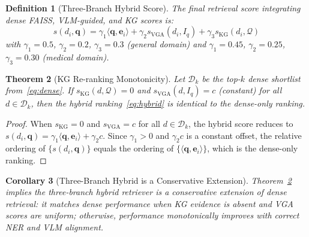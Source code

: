 \documentclass[10pt,conference]{IEEEtran}
\theoremstyle{ieeethm}
\newtheorem{theorem}{Theorem}
\newtheorem{corollary}[theorem]{Corollary}
\theoremstyle{ieeedef}
\newtheorem{definition}[theorem]{Definition}
\theoremstyle{ieeeremark}
\begin{document}
\begin{definition}[Three-Branch Hybrid Score]
\label{def:hybrid}
The final retrieval score integrating dense FAISS, VLM-guided, and KG scores is:
\begin{equation}
s(d_i, \mathbf{q}) = \gamma_1 \langle \mathbf{q}, \mathbf{e}_i \rangle + \gamma_2 s_\text{VGA}(d_i, I_q) + \gamma_3 s_\text{KG}(d_i, \mathcal{Q})
\label{eq:hybrid}
\end{equation}
with $\gamma_1{=}0.5$, $\gamma_2{=}0.2$, $\gamma_3{=}0.3$ (general domain) and $\gamma_1{=}0.45$, $\gamma_2{=}0.25$, $\gamma_3{=}0.30$ (medical domain).
\end{definition}

\begin{theorem}[KG Re-ranking Monotonicity]
\label{thm:monotonicity}
Let $\mathcal{D}_k$ be the top-$k$ dense shortlist from~\eqref{eq:dense}. If $s_{\text{KG}}(d, \mathcal{Q}) = 0$ and $s_\text{VGA}(d, I_q) = c$ (constant) for all $d \in \mathcal{D}_k$, then the hybrid ranking~\eqref{eq:hybrid} is identical to the dense-only ranking.
\end{theorem}
\begin{proof}
When $s_{\text{KG}} = 0$ and $s_\text{VGA} = c$ for all $d \in \mathcal{D}_k$, the hybrid score reduces to $s(d_i,\mathbf{q}) = \gamma_1\langle\mathbf{q},\mathbf{e}_i\rangle + \gamma_2 c$. Since $\gamma_1 > 0$ and $\gamma_2 c$ is a constant offset, the relative ordering of $\{s(d_i,\mathbf{q})\}$ equals the ordering of $\{\langle\mathbf{q},\mathbf{e}_i\rangle\}$, which is the dense-only ranking.
\end{proof}

\begin{corollary}[Three-Branch Hybrid is a Conservative Extension]
\label{cor:no_degrade}
Theorem~\ref{thm:monotonicity} implies the three-branch hybrid retriever is a conservative extension of dense retrieval: it matches dense performance when KG evidence is absent and VGA scores are uniform; otherwise, performance monotonically improves with correct NER and VLM alignment.
\end{corollary}
\end{document}
